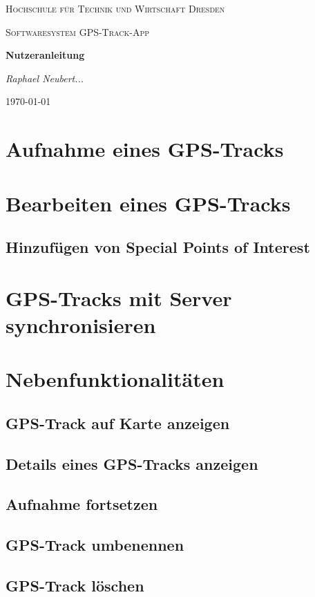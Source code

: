 \documentclass{article}
\begin{document}
\begin{titlepage}
    \centering
    {\scshape\LARGE Hochschule für Technik und Wirtschaft Dresden \par}
    \vspace{1cm}
    {\scshape\Large Softwaresystem \glqq GPS-Track-App\grqq\par}
    \vspace{1.5cm}
    {\huge\bfseries Nutzeranleitung\par}
    \vspace{2cm}
    {\Large\itshape Raphael Neubert... \par}
    \vfill

    {\large \today\par}
\end{titlepage}

\tableofcontents
\newpage

\section{Aufnahme eines GPS-Tracks}
\section{Bearbeiten eines GPS-Tracks}
\subsection{Hinzufügen von Special Points of Interest}
\section{GPS-Tracks mit Server synchronisieren}
\section{Nebenfunktionalitäten}
\subsection{GPS-Track auf Karte anzeigen}
\subsection{Details eines GPS-Tracks anzeigen}
\subsection{Aufnahme fortsetzen}
\subsection{GPS-Track umbenennen}
\subsection{GPS-Track löschen}
\end{document}
